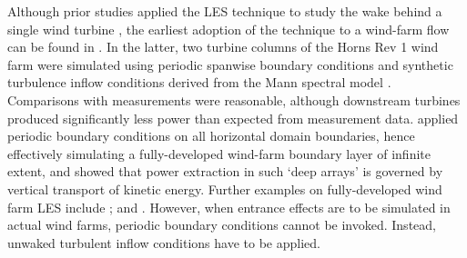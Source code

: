 Although prior studies applied the LES technique to study the wake behind a single wind turbine \citep{troldborg2007actuator, jimenez2007advances, jimenez2008large}, the earliest adoption of the technique to a wind-farm flow can be found in \cite{ivanell2009numerical}. In the latter, two turbine columns of the Horns Rev 1 wind farm were simulated using periodic spanwise boundary conditions and synthetic turbulence inflow conditions derived from the Mann spectral model \citep{mann1998wind}. Comparisons with measurements were reasonable, although downstream turbines produced significantly less power than expected from measurement data.  \cite{calaf2010large} applied periodic boundary conditions on all horizontal domain boundaries, hence effectively simulating a fully-developed wind-farm boundary layer of infinite extent, and showed that power extraction in such `deep arrays' is governed by vertical transport of kinetic energy. Further examples on fully-developed wind farm LES include \cite{calaf2011large,yang2012computational,verhulst2014large,yang2014large,cortina2016distribution}; and \cite{sharma2017perturbations}. However, when entrance effects are to be simulated in actual wind farms, periodic boundary conditions cannot be invoked. Instead, unwaked turbulent inflow conditions have to be applied.

